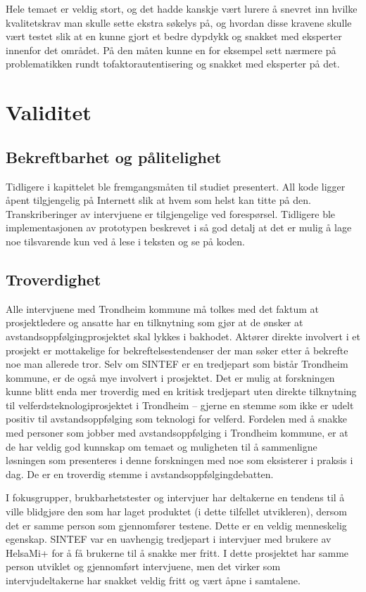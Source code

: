 Hele temaet er veldig stort, og det hadde kanskje vært
lurere å snevret inn hvilke kvalitetskrav man skulle sette ekstra søkelys på, og hvordan disse kravene
skulle vært testet slik at en kunne gjort et bedre dypdykk
og snakket med eksperter innenfor det området. På den måten kunne en for eksempel sett nærmere på problematikken rundt
tofaktorautentisering og snakket med eksperter på det.

\section{Validitet}
\label{sec:validitet}

\subsection{Bekreftbarhet og pålitelighet}
Tidligere i kapittelet ble fremgangsmåten til studiet presentert. All kode ligger åpent tilgjengelig på Internett slik at hvem som helst kan
titte på den. Transkriberinger av intervjuene er tilgjengelige ved forespørsel. Tidligere ble implementasjonen av prototypen beskrevet i
så god detalj at det er mulig å lage noe tilsvarende kun ved å lese i teksten og se på koden.

\subsection{Troverdighet}
Alle intervjuene med Trondheim kommune må tolkes med det faktum at prosjektledere og ansatte har en tilknytning som
gjør at de ønsker at avstandsoppfølgingprosjektet
skal lykkes i bakhodet. Aktører direkte involvert i et prosjekt er mottakelige for bekreftelsestendenser der man søker etter å bekrefte noe
man allerede tror. Selv om SINTEF er en tredjepart som bistår Trondheim kommune, er de også mye involvert i prosjektet.
Det er mulig at forskningen kunne blitt enda mer troverdig med en kritisk tredjepart uten direkte tilknytning til velferdsteknologiprosjektet i Trondheim --
gjerne en stemme som ikke er udelt positiv til avstandsoppfølging som teknologi for velferd.
Fordelen med å snakke med personer som jobber med avstandsoppfølging i Trondheim kommune, er at de har veldig god kunnskap om temaet
og muligheten til å sammenligne løsningen som presenteres i denne forskningen med noe som eksisterer i praksis i dag.
De er en troverdig stemme i avstandsoppfølgingdebatten.

I fokusgrupper, brukbarhetstester og intervjuer har deltakerne en tendens til å ville blidgjøre
den som har laget produktet (i dette tilfellet utvikleren), dersom det er samme person som
gjennomfører testene. Dette er en veldig menneskelig egenskap. SINTEF var en uavhengig tredjepart i intervjuer
med brukere av HelsaMi+ for å få brukerne til å snakke mer fritt. I dette prosjektet har samme person utviklet og gjennomført
intervjuene, men det virker som intervjudeltakerne har snakket veldig fritt og vært åpne i samtalene.

